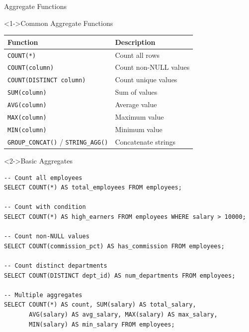 \documentclass[aspectratio=169,11pt]{beamer}
\begin{document}
\begin{frame}[fragile]{Aggregate Functions}
\begin{block}<1->{Common Aggregate Functions}
\begin{center}
\begin{tabular}{ll}
\toprule
\textbf{Function} & \textbf{Description} \\
\midrule
\texttt{COUNT(*)} & Count all rows \\
\texttt{COUNT(column)} & Count non-NULL values \\
\texttt{COUNT(DISTINCT column)} & Count unique values \\
\texttt{SUM(column)} & Sum of values \\
\texttt{AVG(column)} & Average value \\
\texttt{MAX(column)} & Maximum value \\
\texttt{MIN(column)} & Minimum value \\
\texttt{GROUP_CONCAT()} / \texttt{STRING_AGG()} & Concatenate strings \\
\bottomrule
\end{tabular}
\end{center}
\end{block}

\pause
\begin{exampleblock}<2->{Basic Aggregates}
\begin{lstlisting}
-- Count all employees
SELECT COUNT(*) AS total_employees FROM employees;

-- Count with condition
SELECT COUNT(*) AS high_earners FROM employees WHERE salary > 10000;

-- Count non-NULL values
SELECT COUNT(commission_pct) AS has_commission FROM employees;

-- Count distinct departments
SELECT COUNT(DISTINCT dept_id) AS num_departments FROM employees;

-- Multiple aggregates
SELECT COUNT(*) AS count, SUM(salary) AS total_salary,
       AVG(salary) AS avg_salary, MAX(salary) AS max_salary,
       MIN(salary) AS min_salary FROM employees;
\end{lstlisting}
\end{exampleblock}
\end{frame}
\end{document}
